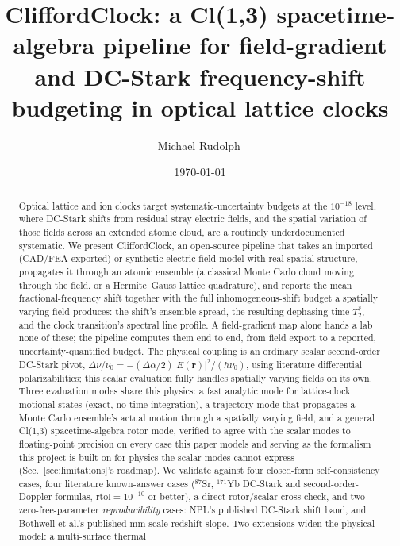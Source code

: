 \documentclass[aps,pra,superscriptaddress,groupedaddress,nofootinbib]{revtex4-2}
\begin{document}
\title{CliffordClock: a Cl(1,3) spacetime-algebra pipeline for field-gradient
and DC-Stark frequency-shift budgeting in optical lattice clocks}

\author{Michael Rudolph\,}

\date{\today}

\begin{abstract}
Optical lattice and ion clocks target systematic-uncertainty budgets at
the $10^{-18}$ level, where DC-Stark shifts from residual stray electric
fields, and the spatial variation of those fields across an extended
atomic cloud, are a routinely underdocumented systematic. We present CliffordClock, an
open-source pipeline that takes an imported (CAD/FEA-exported) or
synthetic electric-field model with real spatial structure, propagates it
through an atomic ensemble (a classical Monte Carlo cloud moving through
the field, or a Hermite--Gauss lattice quadrature), and reports the mean
fractional-frequency shift together with the full inhomogeneous-shift
budget a spatially varying field produces: the shift's ensemble spread,
the resulting dephasing time $T_2^*$, and the clock transition's spectral
line profile. A field-gradient map alone hands a lab none of these; the
pipeline computes them end to end, from field export to a reported,
uncertainty-quantified budget. The physical coupling is an
ordinary scalar second-order DC-Stark pivot,
$\Delta\nu/\nu_0 = -(\Delta\alpha/2)|E(\mathbf{r})|^2/(h\nu_0)$, using
literature differential polarizabilities; this scalar evaluation fully
handles spatially varying fields on its own. Three evaluation modes share
this physics: a fast analytic mode for lattice-clock motional states
(exact, no time integration), a trajectory mode that propagates a
Monte Carlo ensemble's actual motion through a spatially varying field,
and a general Cl(1,3) spacetime-algebra rotor mode, verified to agree
with the scalar modes to floating-point precision on every case this
paper models and serving as the formalism this project is built on for
physics the scalar modes cannot express
(Sec.~\ref{sec:limitations}'s roadmap). We
validate against four closed-form self-consistency cases, four literature
known-answer cases ($^{87}$Sr, $^{171}$Yb DC-Stark and second-order-Doppler
formulas, $\mathrm{rtol}=10^{-10}$ or better), a direct rotor/scalar
cross-check, and two zero-free-parameter \emph{reproducibility}
cases: NPL's published DC-Stark shift band, and Bothwell et al.'s
published mm-scale redshift slope. Two extensions widen the physical model: a multi-surface thermal

\end{abstract}
\end{document}
